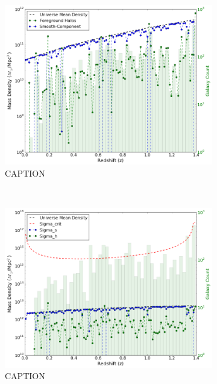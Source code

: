 \documentclass[%
 reprint,
 amsmath,amssymb,
 aps,nofootinbib
]{revtex4-1}
\begin{document}
\begin{figure}
    \centering
    \begin{subfigure}[H]{0.49\textwidth}
        \includegraphics[width=\textwidth]{figs-swe/thesis/vol_densities.png}
        \captionsetup{justification=raggedright,singlelinecheck=false}
        \caption{CAPTION}
        \label{fig:volume_densities}
    \end{subfigure}
    ~
    \begin{subfigure}[H]{0.49\textwidth}
        \includegraphics[width=\textwidth]{figs-swe/thesis/surf_densities.png}
        \captionsetup{justification=raggedright,singlelinecheck=false}
        \caption{CAPTION}
        \label{fig:surface_densities}
    \end{subfigure}
    \caption{}
\end{figure}
\end{document}
